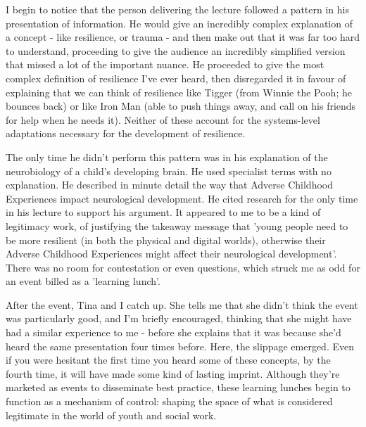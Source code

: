 I begin to notice that the person delivering the lecture followed a pattern in his presentation of information. He would give an incredibly complex explanation of a concept - like resilience, or trauma - and then make out that it was far too hard to understand, proceeding to give the audience an incredibly simplified version that missed a lot of the important nuance. He proceeded to give the most complex definition of resilience I've ever heard, then disregarded it in favour of explaining that we can think of resilience like Tigger (from Winnie the Pooh; he bounces back) or like Iron Man (able to push things away, and call on his friends for help when he needs it). Neither of these account for the systems-level adaptations necessary for the development of resilience.

The only time he didn't perform this pattern was in his explanation of the neurobiology of a child's developing brain. He used specialist terms with no explanation. He described in minute detail the way that Adverse Childhood Experiences impact neurological development. He cited research for the only time in his lecture to support his argument. It appeared to me to be a kind of legitimacy work, of justifying the takeaway message that 'young people need to be more resilient (in both the physical and digital worlds), otherwise their Adverse Childhood Experiences might affect their neurological development'. There was no room for contestation or even questions, which struck me as odd for an event billed as a 'learning lunch'.

After the event, Tina and I catch up. She tells me that she didn't think the event was particularly good, and I'm briefly encouraged, thinking that she might have had a similar experience to me - before she explains that it was because she'd heard the same presentation four times before. Here, the slippage emerged. Even if you were hesitant the first time you heard some of these concepts, by the fourth time, it will have made some kind of lasting imprint. Although they're marketed as events to disseminate best practice, these learning lunches begin to function as a mechanism of control: shaping the space of what is considered legitimate in the world of youth and social work. 

